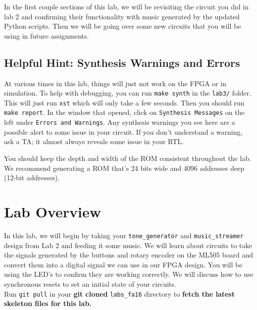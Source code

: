 \documentclass[11pt]{article}
\begin{document}
In the first couple sections of this lab, we will be revisiting the circuit you did in lab 2 and confirming their functionality with music generated by the updated Python scripts. Then we will be going over some new circuits that you will be using in future assignments.

\subsection{Helpful Hint: Synthesis Warnings and Errors}
At various times in this lab, things will just not work on the FPGA or in simulation. To help with debugging, you can run \verb|make synth| in the \verb|lab3/| folder. This will just run \verb|xst| which will only take a few seconds. Then you should run \verb|make report|. In the window that opened, click on \verb|Synthesis Messages| on the left under \verb|Errors and Warnings|. Any synthesis warnings you see here are a possible alert to some issue in your circuit. If you don't understand a warning, ask a TA; it almost always reveals some issue in your RTL.


You should keep the depth and width of the ROM consistent throughout the lab. We recommend generating a ROM that's 24 bits wide and 4096 addresses deep (12-bit addresses).
\section{Lab Overview}

In this lab, we will begin by taking your \verb|tone_generator| and \verb|music_streamer| design from Lab 2 and feeding it some music. We will learn about circuits to take the signals generated by the buttons and rotary encoder on the ML505 board and convert them into a digital signal we can use in our FPGA design. You will be using the LED's to confirm they are working correctly. We will discuss how to use synchronous resets to set an initial state of your circuits.\\

Run \verb|git pull| in your \textbf{git cloned} \verb|labs_fa16| directory to \textbf{fetch the latest skeleton files for this lab.}
\end{document}
